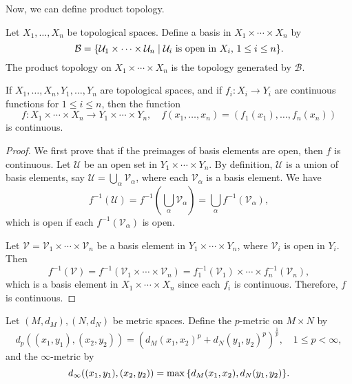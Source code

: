 Now, we can define product topology.

\begin{df}
    Let $X_1, \ldots, X_n$ be topological spaces. Define a basis in $X_1 \times \cdots \times X_n$ by
    \[
    \mathcal B = {\left\{{\mathcal U_1 \times \cdots \times \mathcal U_n \mid \mathcal U_i \text{ is open in }X_i,\, 1\leq i\leq n}\right\}}.
    \]
    The product topology on $X_1 \times \cdots \times X_n$ is the topology generated by $\mathcal B$.
\end{df}

\begin{prop}
    If $X_1, \ldots, X_n, Y_1, \ldots, Y_n$ are topological spaces, and if $f_i: X_i \to Y_i$ are continuous functions for $1\leq i\leq n$, then the function
    \[
    f: X_1 \times \cdots \times X_n \to Y_1 \times \cdots \times Y_n, \quad f(x_1, \ldots, x_n) = (f_1(x_1), \ldots, f_n(x_n))
    \]
    is continuous.
    \begin{proof}
        We first prove that if the preimages of basis elements are open, then $f$ is continuous. Let $\mathcal U$ be an open set in $Y_1 \times \cdots \times Y_n$. By definition, $\mathcal U$ is a union of basis elements, say $\mathcal U = \bigcup_\alpha \mathcal V_\alpha$, where each $\mathcal V_\alpha$ is a basis element. We have
        \[
        f^{-1}(\mathcal U) = f^{-1}\left(\bigcup_\alpha \mathcal V_\alpha\right) = \bigcup_\alpha f^{-1}(\mathcal V_\alpha),
        \]
        which is open if each $f^{-1}(\mathcal V_\alpha)$ is open.

        Let $\mathcal V = \mathcal V_1 \times \cdots \times \mathcal V_n$ be a basis element in $Y_1 \times \cdots \times Y_n$, where $\mathcal V_i$ is open in $Y_i$. Then
        \[
        f^{-1}(\mathcal V) = f^{-1}(\mathcal V_1 \times \cdots \times \mathcal V_n) = f_1^{-1}(\mathcal V_1) \times \cdots \times f_n^{-1}(\mathcal V_n),
        \]
        which is a basis element in $X_1 \times \cdots \times X_n$ since each $f_i$ is continuous. Therefore, $f$ is continuous.
    \end{proof}
\end{prop}

\begin{df}
    Let $(M, d_M), (N, d_N)$ be metric spaces. Define the $p$-metric on $M\times N$ by
    \[
    d_p((x_1, y_1), (x_2, y_2)) = \left(d_M(x_1, x_2)^p + d_N(y_1, y_2)^p\right)^{\frac1p}, \quad 1\leq p < \infty,
    \]
    and the $\infty$-metric by
    \[
    d_\infty((x_1, y_1), (x_2, y_2)) = \max{\left\{{d_M(x_1, x_2), d_N(y_1, y_2)}\right\}}.
    \]
\end{df}

